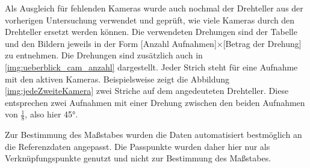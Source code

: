 \documentclass[./00PhotoBox.tex]{subfiles}
\begin{document}
Als Ausgleich für fehlenden Kameras wurde auch nochmal der Drehteller aus der vorherigen Untersuchung verwendet und geprüft, wie viele Kameras durch den Drehteller ersetzt werden können. Die verwendeten Drehungen sind der Tabelle und den Bildern jeweils in der Form [Anzahl Aufnahmen]$\times$[Betrag der Drehung] zu entnehmen. Die Drehungen sind zusätzlich auch in \autoref{img:ueberblick_cam_anzahl} dargestellt. Jeder Strich steht für eine Aufnahme mit den aktiven Kameras. Beispielsweise zeigt die Abbildung \autoref{img:jedeZweiteKamera} zwei Striche auf dem angedeuteten Drehteller. Diese entsprechen zwei Aufnahmen mit einer Drehung zwischen den beiden Aufnahmen von $\frac{1}{8}$, also hier \ang{45}.

Zur Bestimmung des Maßstabes wurden die Daten automatisiert bestmöglich an die Referenzdaten angepasst. Die Passpunkte wurden daher hier nur als Verknüpfungspunkte genutzt und nicht zur Bestimmung des Maßstabes.
\end{document}
